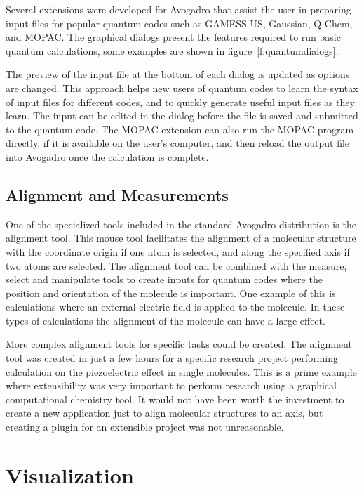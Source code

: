 \documentclass[10pt]{bmc_article}
\newenvironment{bmcformat}{\begin{raggedright}
\baselineskip20pt\sloppy\setboolean{publ}{false}}{\end{raggedright}
\baselineskip20pt\sloppy}
\begin{document}
\begin{bmcformat}
Several extensions were developed for Avogadro that assist the user in preparing
input files for popular quantum codes such as GAMESS-US, Gaussian, Q-Chem, and
MOPAC. The graphical dialogs present the features required to run basic quantum
calculations, some examples are shown in figure~\ref{f:quantumdialogs}.

The preview of the input file at the bottom of each dialog is updated as options
are changed. This approach helps new users of quantum codes to learn the syntax
of input files for different codes, and to quickly generate useful input files
as they learn. The input can be edited in the dialog before the file is saved
and submitted to the quantum code. The MOPAC extension can also run the  MOPAC
program directly, if it is available on the user's computer, and then reload the
output file into Avogadro once the calculation is complete.

\subsection{Alignment and Measurements}

One of the specialized tools included in the standard Avogadro distribution is
the alignment tool. This mouse tool facilitates the alignment of a molecular
structure with the coordinate origin if one atom is selected, and along the
specified axis if two atoms are selected. The alignment tool can be combined
with the measure, select and manipulate tools to create inputs for
quantum codes where the position and orientation of the molecule is important.
One example of this is calculations where an external electric field is applied
to the molecule. In these types of calculations the alignment of the molecule
can have a large effect.

More complex alignment tools for specific tasks could be created. The alignment
tool was created in just a few hours for a specific research project performing
calculation on the piezoelectric effect in single molecules. This is a prime
example where extensibility was very important to perform
research using a graphical computational chemistry tool. It would not have been
worth the investment to create a new application just to align molecular
structures to an axis, but creating a plugin for an extensible project was not
unreasonable.


\section{Visualization}


\end{bmcformat}
\end{document}
